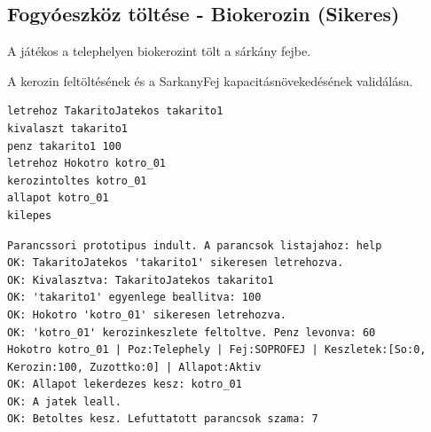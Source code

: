 \subsection{Fogyóeszköz töltése - Biokerozin (Sikeres)}
\begin{test-case-description}
    A játékos a telephelyen biokerozint tölt a sárkány fejbe.
\end{test-case-description}
\begin{test-case-function}
    A kerozin feltöltésének és a SarkanyFej kapacitásnövekedésének validálása.
\end{test-case-function}
\begin{test-case-input}
\begin{verbatim}
letrehoz TakaritoJatekos takarito1
kivalaszt takarito1
penz takarito1 100
letrehoz Hokotro kotro_01
kerozintoltes kotro_01
allapot kotro_01
kilepes
\end{verbatim}
\end{test-case-input}
\begin{test-case-output}
\begin{verbatim}
Parancssori prototipus indult. A parancsok listajahoz: help
OK: TakaritoJatekos 'takarito1' sikeresen letrehozva.
OK: Kivalasztva: TakaritoJatekos takarito1
OK: 'takarito1' egyenlege beallitva: 100
OK: Hokotro 'kotro_01' sikeresen letrehozva.
OK: 'kotro_01' kerozinkeszlete feltoltve. Penz levonva: 60
Hokotro kotro_01 | Poz:Telephely | Fej:SOPROFEJ | Keszletek:[So:0, Kerozin:100, Zuzottko:0] | Allapot:Aktiv
OK: Allapot lekerdezes kesz: kotro_01
OK: A jatek leall.
OK: Betoltes kesz. Lefuttatott parancsok szama: 7
\end{verbatim}
\end{test-case-output}

